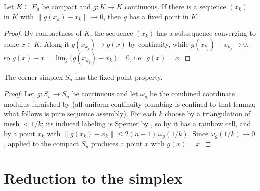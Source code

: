 \begin{lemma}
    \label{lem:approx-fixed-limit}
    Let $K \subseteq E_d$ be compact and $g : K \to K$ continuous. If there is a
    sequence $(x_k)$ in $K$ with $\lVert g(x_k) - x_k \rVert \to 0$, then $g$ has
    a fixed point in $K$.
\end{lemma}
\begin{proof}
    By compactness of $K$, the sequence $(x_k)$ has a subsequence converging to
    some $x \in K$. Along it $g(x_{k_j}) \to g(x)$ by continuity, while
    $g(x_{k_j}) - x_{k_j} \to 0$, so
    $g(x) - x = \lim_j \bigl(g(x_{k_j}) - x_{k_j}\bigr) = 0$, i.e.\ $g(x) = x$.
\end{proof}

\begin{theorem}
    \label{thm:simplex-brouwer}
    The corner simplex $S_n$ has the fixed-point property.
\end{theorem}
\begin{proof}
    Let $g : S_n \to S_n$ be continuous and let $\omega_g$ be the combined
    coordinate modulus furnished by  (all
    uniform-continuity plumbing is confined to that lemma; what follows is pure
    sequence assembly). For each $k$ choose by  a
    triangulation of mesh $< 1/k$; its induced labeling is Sperner by
    , so by  it has a rainbow
    cell, and by  a point $x_k$ with
    $\lVert g(x_k) - x_k \rVert \le 2(n+1)\,\omega_g(1/k)$. Since
    $\omega_g(1/k) \to 0$,  applied to the compact
    $S_n$ produces a point $x$ with $g(x) = x$.
\end{proof}

\section{Reduction to the simplex}

